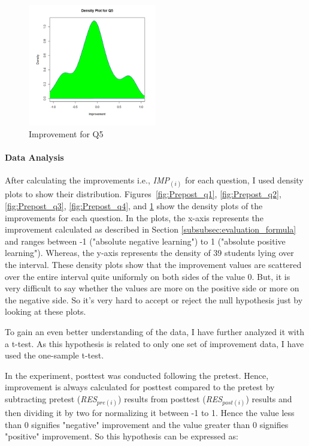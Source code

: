 \begin{figure}
	\centering
	\includegraphics[width=0.5\textwidth]{figures/Prepost_q5}
	\caption{Improvement for Q5}
	\label{fig:Prepost_q5}
\end{figure}

\paragraph{Data Analysis}
After calculating the improvements i.e., \textit{IMP$_{(i)}$} for each question, I used density plots to show their distribution. Figures~\ref{fig:Prepost_q1}, \ref{fig:Prepost_q2}, \ref{fig:Prepost_q3}, \ref{fig:Prepost_q4}, and \ref{fig:Prepost_q5} show the density plots of the improvements for each question. In the plots, the x-axis represents the improvement calculated as described in Section \ref{subsubsec:evaluation_formula} and ranges between -1 ("absolute negative learning") to 1 ("absolute positive learning"). Whereas, the y-axis represents the density of 39 students lying over the interval. 
These density plots show that the improvement values are scattered over the entire interval quite uniformly on both sides of the value 0. But, it is very difficult to say whether the values are more on the positive side or more on the negative side. So it's very hard to accept or reject the null hypothesis just by looking at these plots.

To gain an even better understanding of the data, I have further analyzed it with a t-test. As this hypothesis is related to only one set of improvement data, I have used the one-sample t-test.   

In the experiment, posttest was conducted following the pretest. Hence, improvement is always calculated for posttest compared to the pretest by subtracting pretest (\textit{RES$_{pre(i)}$}) results from posttest (\textit{RES$_{post(i)}$}) results and then dividing it by two for normalizing it between -1 to 1. Hence the value less than 0 signifies "negative" improvement and the value greater than 0 signifies "positive" improvement. So this hypothesis can be expressed as:   

